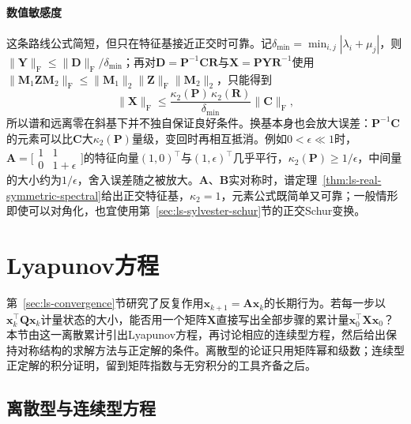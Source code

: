 \paragraph{数值敏感度}
这条路线公式简短，但只在特征基接近正交时可靠。记$\delta_{\min}=\min_{i,j}|\lambda_i+\mu_j|$，则$\lVert\bm Y\rVert_{\mathrm F}\leq\lVert\bm D\rVert_{\mathrm F}/\delta_{\min}$；再对$\bm D=\bm P^{-1}\bm C\bm R$与$\bm X=\bm P\bm Y\bm R^{-1}$使用$\lVert\bm M_1\bm Z\bm M_2\rVert_{\mathrm F}\leq\lVert\bm M_1\rVert_2\lVert\bm Z\rVert_{\mathrm F}\lVert\bm M_2\rVert_2$，只能得到
\[
 \lVert\bm X\rVert_{\mathrm F}
 \leq\frac{\kappa_2(\bm P)\,\kappa_2(\bm R)}{\delta_{\min}}\lVert\bm C\rVert_{\mathrm F},
\]
所以谱和远离零在斜基下并不独自保证良好条件。换基本身也会放大误差：$\bm P^{-1}\bm C$的元素可以比$\bm C$大$\kappa_2(\bm P)$量级，变回时再相互抵消。例如$0<\epsilon\ll1$时，$\bm A=\bigl[\begin{smallmatrix}1&1\\0&1+\epsilon\end{smallmatrix}\bigr]$的特征向量$(1,0)^\top$与$(1,\epsilon)^\top$几乎平行，$\kappa_2(\bm P)\geq1/\epsilon$，中间量的大小约为$1/\epsilon$，舍入误差随之被放大。$\bm A$、$\bm B$实对称时，谱定理~\ref{thm:ls-real-symmetric-spectral}给出正交特征基，$\kappa_2=1$，元素公式既简单又可靠；一般情形即使可以对角化，也宜使用第~\ref{sec:ls-sylvester-schur}节的正交Schur变换。

\section{Lyapunov方程}
\label{sec:ls-lyapunov}

第~\ref{sec:ls-convergence}节研究了反复作用$\bm x_{k+1}=\bm A\bm x_k$的长期行为。若每一步以$\bm x_k^\top\bm Q\bm x_k$计量状态的大小，能否用一个矩阵$\bm X$直接写出全部步骤的累计量$\bm x_0^\top\bm X\bm x_0$？本节由这一离散累计引出Lyapunov方程，再讨论相应的连续型方程，然后给出保持对称结构的求解方法与正定解的条件。离散型的论证只用矩阵幂和级数；连续型正定解的积分证明，留到矩阵指数与无穷积分的工具齐备之后。

\subsection{离散型与连续型方程}
\label{sec:ls-lyapunov-solvability}

